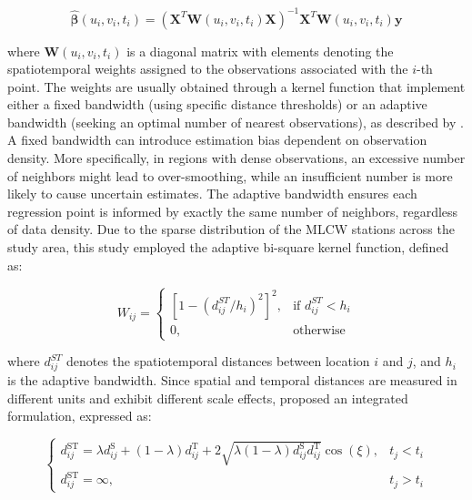 \begin{equation}
\hat{\boldsymbol{\beta}}(u_i, v_i, t_i) = (\mathbf{X}^T\mathbf{W}(u_i, v_i, t_i)\mathbf{X})^{-1}\mathbf{X}^T\mathbf{W}(u_i, v_i, t_i) \mathbf{y}
\label{eq:coeff_gtwr}
\end{equation}

\noindent where $\mathbf{W}(u_i, v_i, t_i)$ is a diagonal matrix with elements denoting the spatiotemporal weights assigned to the observations associated with the $i$-th point. The weights are usually obtained through a kernel function that implement either a fixed bandwidth (using specific distance thresholds) or an adaptive bandwidth (seeking an optimal number of nearest observations), as described by \citet{Paez2002Framework}. A fixed bandwidth can introduce estimation bias dependent on observation density. More specifically, in regions with dense observations, an excessive number of neighbors might lead to over-smoothing, while an insufficient number is more likely to cause uncertain estimates. The adaptive bandwidth ensures each regression point is informed by exactly the same number of neighbors, regardless of data density. Due to the sparse distribution of the MLCW stations across the study area, this study employed the adaptive bi-square kernel function, defined as:

\begin{equation}
W_{ij} = \begin{cases} 
	[1 - (d^{ST}_{ij}/h_i)^2]^2, & \text{if } d^{ST}_{ij} < h_i \\
	0, & \text{otherwise}
\end{cases}
\label{eq:bisquare}
\end{equation}

\noindent where $d^{ST}_{ij}$ denotes the spatiotemporal distances between location $i$ and $j$, and $h_i$ is the adaptive bandwidth. Since spatial and temporal distances are measured in different units and exhibit different scale effects, \citet{Wu2014Geographically} proposed an integrated formulation, expressed as:

\begin{equation}
\begin{cases}
	d_{ij}^{\text{ST}} = \lambda d_{ij}^{\text{S}} + (1-\lambda) d_{ij}^{\text{T}} + 2 \sqrt{\lambda (1-\lambda) d_{ij}^{\text{S}} d_{ij}^{\text{T}}} \cos(\xi), & t_j < t_i \\
	d_{ij}^{\text{ST}} = \infty, & t_j > t_i
\end{cases}
\label{eq:st_dist}
\end{equation}

